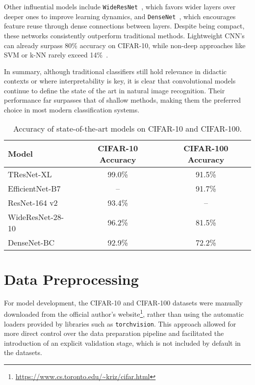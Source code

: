 \documentclass[journal,article,submit,pdftex,moreauthors]{Definitions/mdpi}
\begin{document}
Other influential models include \texttt{WideResNet}~\cite{wideresnet}, which favors wider layers over deeper ones to improve learning dynamics, and \texttt{DenseNet}~\cite{densenet}, which encourages feature reuse through dense connections between layers. Despite being compact, these networks consistently outperform traditional methods. Lightweight CNN's can already surpass 80\% accuracy on CIFAR-10, while non-deep approaches like SVM or k-NN rarely exceed 14\%~\cite{researchgate1}.

In summary, although traditional classifiers still hold relevance in didactic contexts or where interpretability is key, it is clear that convolutional models continue to define the state of the art in natural image recognition. Their performance far surpasses that of shallow methods, making them the preferred choice in most modern classification systems.

\begin{table}[H]
\caption{Accuracy of state-of-the-art models on CIFAR-10 and CIFAR-100.\label{tab:accuracies_sota}}
\begin{tabularx}{\textwidth}{lCC}
\toprule
\textbf{Model} & \textbf{CIFAR-10 Accuracy} & \textbf{CIFAR-100 Accuracy} \\
\midrule
TResNet-XL        & 99.0\% & 91.5\% \\
EfficientNet-B7   & --     & 91.7\% \\
ResNet-164 v2     & 93.4\% & --     \\
WideResNet-28-10  & 96.2\% & 81.5\% \\
DenseNet-BC       & 92.9\% & 72.2\% \\
\bottomrule
\end{tabularx}
\end{table}

\section{Data Preprocessing}
\label{sec:data_processing}

For model development, the CIFAR-10 and CIFAR-100 datasets were manually downloaded from the official author's website\footnote{\url{https://www.cs.toronto.edu/~kriz/cifar.html}}, rather than using the automatic loaders provided by libraries such as \texttt{torchvision}. This approach allowed for more direct control over the data preparation pipeline and facilitated the introduction of an explicit validation stage, which is not included by default in the datasets.
\end{document}
